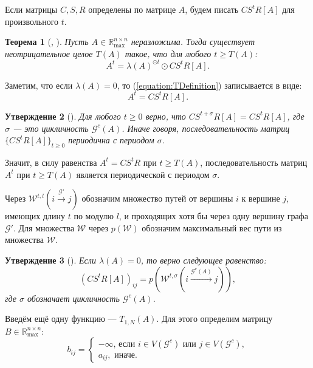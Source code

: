 \documentclass[12pt]{article}
\newtheorem{theorem}{Теорема}[section]
\newtheorem{proposition}[theorem]{Утверждение}
\begin{document}
Если матрицы $C, S, R$ определены по матрице $A$, будем писать $CS^tR[A]$ для произвольного $t$.
\begin{theorem}[\cite{bounds}, \cite{15WeakCSRExpantion}]
\label{theorem:CSRdecompositionTheorem}
Пусть $A \in \mathbb{R}_{\max}^{n \times n}$ неразложима. Тогда существует неотрицательное целое $T(A)$ такое, что для любого $t \ge T(A)$:
\begin{equation}
\label{equation:TDefinition}
    A^t = \lambda(A)^{\odot t} \odot CS^tR[A].
\end{equation}
\end{theorem}

Заметим, что если $\lambda(A) = 0$, то (\ref{equation:TDefinition}) записывается в виде:
\begin{equation*}
    A^t = CS^tR[A].
\end{equation*}

\begin{proposition} [\cite{21CSRExpansionsOfMatrixPowersInMaxAlgebra}] \label{periodicity}
Для любого $t \ge 0$ верно, что 
$CS^{t+\sigma}R[A] = CS^tR[A]$, где $\sigma$ --- это цикличность $\mathcal{G}^c(A)$. Иначе говоря, последовательность матриц $\{ CS^tR[A]\}_{t\ge0}$ периодична с периодом $\sigma$.
\end{proposition}

Значит, в силу равенства $A^t = CS^tR$ при $t \ge T(A)$, последовательность матриц $A^t$ при $t \ge T(A)$ является периодической с периодом $\sigma$.

Через $\mathcal{W}^{t, l}(i \xrightarrow{\mathcal{G}'} j)$ обозначим множество путей от вершины $i$ к вершине $j$, имеющих длину $t$ по модулю $l$, и проходящих хотя бы через одну вершину графа $\mathcal{G}'$. Для множества $\mathcal{W}$ через $p(\mathcal{W})$ обозначим максимальный вес пути из множества $\mathcal{W}$.

\begin{proposition}[\cite{15WeakCSRExpantion}] \label{entriesInCSR}
Если $\lambda(A) = 0$, то верно следующее равенство:
\begin{equation}
    (CS^tR[A])_{ij} = p(\mathcal{W}^{t, \sigma}(i \xrightarrow{\mathcal{G}^c(A)} j)),
\end{equation}
где $\sigma$ обозначает цикличность $\mathcal{G}^c(A)$.
\end{proposition}

Введём ещё одну функцию --- $T_{1, N}(A)$. Для этого определим матрицу $B \in \mathbb{R}_{\max}^{n \times n}$:
\begin{equation*}
    b_{ij} = 
    \begin{cases}
        -\infty \text{, если $i \in V(\mathcal{G}^c)$ или $j\in V(\mathcal{G}^c)$}, \\
        a_{ij}, \text{ иначе.}
    \end{cases}
\end{equation*}
\end{document}

